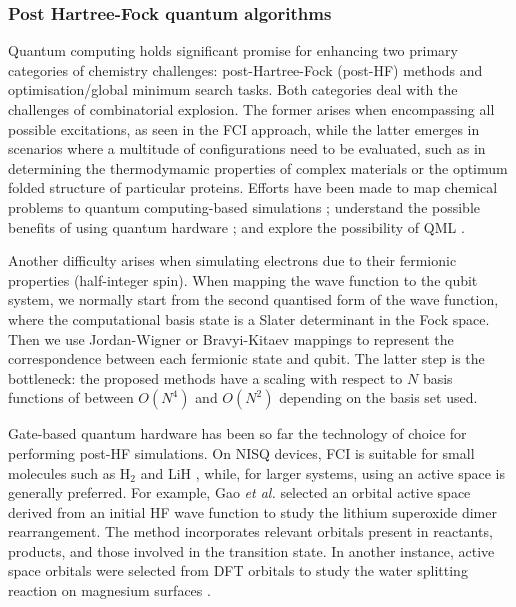 \documentclass[10pt]{iopart}
\begin{document}
\subsubsection{Post Hartree-Fock quantum algorithms}\hfill

Quantum computing holds significant promise for enhancing two primary categories of chemistry challenges: post-Hartree-Fock (post-HF) methods and optimisation/global minimum search tasks. Both categories deal with the challenges of combinatorial explosion. The former arises when encompassing all possible excitations, as seen in the FCI approach, while the latter emerges in scenarios where a multitude of configurations need to be evaluated, such as in determining the thermodymamic properties of complex materials or the optimum folded structure of particular proteins. Efforts have been made to map chemical problems to quantum computing-based simulations \cite{Cao2019,Kassal2011}; understand the possible benefits of using quantum hardware \cite{Bauer2020}; and explore the possibility of QML \cite{Bernal2022}.

Another difficulty arises when simulating electrons due to their fermionic properties (half-integer spin). When mapping the wave function to the qubit system, we normally start from the second quantised form of the wave function, where the computational basis state is a Slater determinant in the Fock space. Then we use Jordan-Wigner or Bravyi-Kitaev mappings \cite{Tranter2018} to represent the correspondence between each fermionic state and qubit. The latter step is the bottleneck: the proposed methods have a scaling with respect to $N$ basis functions of between $O(N^{4})$ \cite{Xia2018} and $O(N^{2})$ \cite{Babbush2014} depending on the basis set used.  

Gate-based quantum hardware has been so far the technology of choice for performing post-HF simulations. On NISQ devices, FCI is suitable for small molecules such as H$_2$ and LiH \cite{McArdle2020}, while, for larger systems, using an active space is generally preferred. For example, Gao \textit{et al.} \cite{Gao2021} selected an orbital active space derived from an initial HF wave function to study the lithium superoxide dimer rearrangement. The method incorporates relevant orbitals present in reactants, products, and those involved in the transition state. In another instance, active space orbitals were selected from DFT orbitals to study the water splitting reaction on magnesium surfaces \cite{Gujarati2022}.
\end{document}
